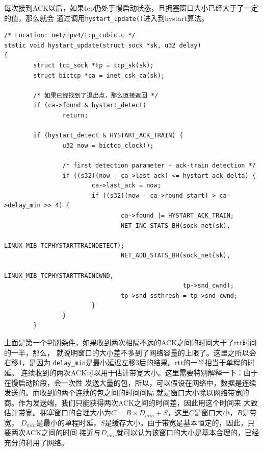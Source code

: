 每次接到ACK以后，如果tcp仍处于慢启动状态，且拥塞窗口大小已经大于了一定的值，那么就会
通过调用\texttt{hystart_update()}进入到hystart算法。
\begin{verbatim}
/* Location: net/ipv4/tcp_cubic.c */
static void hystart_update(struct sock *sk, u32 delay)
{
        struct tcp_sock *tp = tcp_sk(sk);
        struct bictcp *ca = inet_csk_ca(sk);

        /* 如果已经找到了退出点，那么直接返回 */
        if (ca->found & hystart_detect)
                return;

        if (hystart_detect & HYSTART_ACK_TRAIN) {
                u32 now = bictcp_clock();

                /* first detection parameter - ack-train detection */
                if ((s32)(now - ca->last_ack) <= hystart_ack_delta) {
                        ca->last_ack = now;
                        if ((s32)(now - ca->round_start) > ca->delay_min >> 4) {
                                ca->found |= HYSTART_ACK_TRAIN;
                                NET_INC_STATS_BH(sock_net(sk),
                                                 LINUX_MIB_TCPHYSTARTTRAINDETECT);
                                NET_ADD_STATS_BH(sock_net(sk),
                                                 LINUX_MIB_TCPHYSTARTTRAINCWND,
                                                 tp->snd_cwnd);
                                tp->snd_ssthresh = tp->snd_cwnd;
                        }
                }
        }
\end{verbatim}
上面是第一个判别条件，如果收到两次相隔不远的ACK之间的时间大于了rtt时间的一半，那么，
就说明窗口的大小差不多到了网络容量的上限了。这里之所以会右移4，是因为
\texttt{delay_min}是最小延迟左移3后的结果。rtt的一半相当于单程的时延。
连续收到的两次ACK可以用于估计带宽大小。这里需要特别解释一下：由于在慢启动阶段，会一次性
发送大量的包，所以，可以假设在网络中，数据是连续发送的。而收到的两个连续的包之间的时间间隔
就是窗口大小除以网络带宽的商。作为发送端，我们只能获得两次ACK之间的时间差，因此用这个时间来
大致估计带宽。拥塞窗口的合理大小为$C=B\times D_{min}+S$，这里$C$是窗口大小，$B$是带宽，
$D_{min}$是最小的单程时延，$S$是缓存大小。由于带宽是基本恒定的，因此，只要两次ACK之间的时间
接近与$D_{min}$就可以认为该窗口的大小是基本合理的，已经充分的利用了网络。

